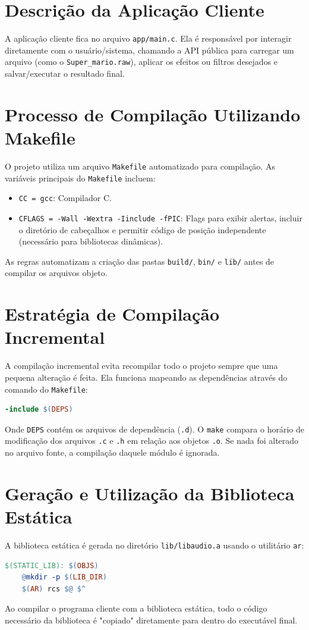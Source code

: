 \documentclass[12pt, a4paper]{article}
\begin{document}
\section{Descrição da Aplicação Cliente}
A aplicação cliente fica no arquivo \texttt{app/main.c}. Ela é responsável por interagir diretamente com o usuário/sistema, chamando a API pública para carregar um arquivo (como o \texttt{Super\_mario.raw}), aplicar os efeitos ou filtros desejados e salvar/executar o resultado final.

\section{Processo de Compilação Utilizando Makefile}
O projeto utiliza um arquivo \texttt{Makefile} automatizado para compilação. As variáveis principais do \texttt{Makefile} incluem:
\begin{itemize}
    \item \texttt{CC = gcc}: Compilador C.
    \item \texttt{CFLAGS = -Wall -Wextra -Iinclude -fPIC}: Flags para exibir alertas, incluir o diretório de cabeçalhos e permitir código de posição independente (necessário para bibliotecas dinâmicas).
\end{itemize}
As regras automatizam a criação das pastas \texttt{build/}, \texttt{bin/} e \texttt{lib/} antes de compilar os arquivos objeto.

\section{Estratégia de Compilação Incremental}
A compilação incremental evita recompilar todo o projeto sempre que uma pequena alteração é feita. Ela funciona mapeando as dependências através do comando do \texttt{Makefile}:
\begin{lstlisting}[language=make]
-include $(DEPS)
\end{lstlisting}
Onde \texttt{DEPS} contém os arquivos de dependência (\texttt{.d}). O \texttt{make} compara o horário de modificação dos arquivos \texttt{.c} e \texttt{.h} em relação aos objetos \texttt{.o}. Se nada foi alterado no arquivo fonte, a compilação daquele módulo é ignorada.

\section{Geração e Utilização da Biblioteca Estática}
A biblioteca estática é gerada no diretório \texttt{lib/libaudio.a} usando o utilitário \texttt{ar}:
\begin{lstlisting}[language=make]
$(STATIC_LIB): $(OBJS)
    @mkdir -p $(LIB_DIR)
    $(AR) rcs $@ $^
\end{lstlisting}
Ao compilar o programa cliente com a biblioteca estática, todo o código necessário da biblioteca é "copiado" diretamente para dentro do executável final.
\end{document}
